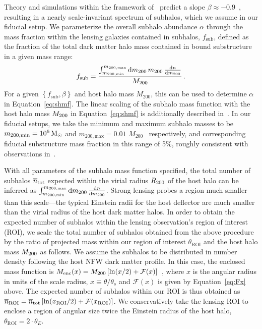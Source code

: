 \documentclass[twocolumn]{aastex63}
\begin{document}
Theory and simulations within the framework of \lcdm~predict a slope $\beta\approx-0.9$~\citep{0802.2265,0809.0898}, resulting in a nearly scale-invariant spectrum of subhalos, which we assume in our fiducial setup. We parameterize the overall subhalo abundance $\alpha$ through the mass fraction within the lensing galaxies contained in subhalos, $f_\mathrm{sub}$, defined as the fraction of the total dark matter halo mass contained in bound substructure in a given mass range:
\begin{equation}
f_\mathrm{sub} = \frac{\int_{m_\mathrm{200, min}}^{m_\mathrm{200, max}}\diff \mtwo\,\mtwo\,\frac{\diff n}{\diff \mtwo}}{M_\mathrm{200}} \,.
\end{equation}
For a given $\left\{f_\mathrm{sub},\beta\right\}$ and host halo mass $M_\mathrm{200}$, this can be used to determine $\alpha$ in Equation~\eqref{eq:shmf}. The linear scaling of the subhalo mass function with the host halo mass $M_{200}$ in Equation~\eqref{eq:shmf} is additionally described in~\citet{2016MNRAS.457.1208H,2017MNRAS.469.1997D}. In our fiducial setups, we take the minimum and maximum subhalo masses to be $m_\mathrm{200, min} = 10^6\,\textrm{M}_\odot$ and $m_\mathrm{200, max} = 0.01\,\,M_\mathrm{200}$~\citep{2017MNRAS.469.1997D,2018PhRvD..97l3002H} respectively, and corresponding fiducial substructure mass fraction in this range of 5\%, roughly consistent with observations in~\citet{2002ApJ...572...25D,2018PhRvD..97l3002H,2019arXiv190504182H}.

With all parameters of the subhalo mass function specified, the total number of subhalos $\mean{n}_{\mathrm{tot}}$ expected within the virial radius $R_{200}$ of the host halo can be inferred as $\int_{m_\mathrm{200, min}}^{m_\mathrm{200, max}}\mathrm{d} m_{200}\,\frac{\mathrm{d} n}{\mathrm{d} m_{200}}$. Strong lensing probes a region much smaller than this scale---the typical Einstein radii for the host deflector are much smaller than the virial radius of the host dark matter halos. In order to obtain the expected number of subhalos within the lensing observation's region of interest (ROI), we scale the total number of subhalos obtained from the above procedure by the ratio of projected mass within our region of interest $\theta_\textrm{ROI}$ and the host halo mass $M_{200}$ as follows. We assume the subhalos to be distributed in number density following the host NFW dark matter profile. In this case, the enclosed mass function is $M_\mathrm{enc}(x) = M_{200}\left[\ln(x/2) + \mathcal{F}(x)\right]$~\citep[\eg,][]{2001astro.ph..2341K}, where $x$ is the angular radius in units of the scale radius, $x\equiv \theta/\theta_s$ and $\mathcal{F}(x)$ is given by Equation~\eqref{eq:Fx} above. The expected number of subhalos within our ROI is thus obtained as $\mean n_\mathrm{ROI} = \mean n_\mathrm{tot}\left[\ln(x_\mathrm{ROI}/2) + \mathcal{F}(x_\mathrm{ROI})\right]$. We conservatively take the lensing ROI to enclose a region of angular size twice the Einstein radius of the host halo, $\theta_\mathrm{ROI} = 2\cdot\theta_E$.
\end{document}

